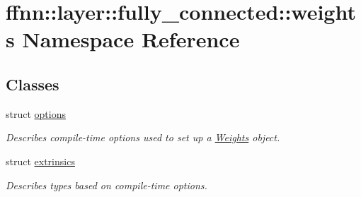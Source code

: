 \hypertarget{namespaceffnn_1_1layer_1_1fully__connected_1_1weights}{\section{ffnn\-:\-:layer\-:\-:fully\-\_\-connected\-:\-:weights Namespace Reference}
\label{namespaceffnn_1_1layer_1_1fully__connected_1_1weights}
}
\subsection*{Classes}
\begin{DoxyCompactItemize}
\item 
struct \hyperlink{structffnn_1_1layer_1_1fully__connected_1_1weights_1_1options}{options}
\begin{DoxyCompactList}\small\item\em Describes compile-\/time options used to set up a \hyperlink{classffnn_1_1layer_1_1fully__connected_1_1_weights}{Weights} object. \end{DoxyCompactList}\item 
struct \hyperlink{structffnn_1_1layer_1_1fully__connected_1_1weights_1_1extrinsics}{extrinsics}
\begin{DoxyCompactList}\small\item\em Describes types based on compile-\/time options. \end{DoxyCompactList}\end{DoxyCompactItemize}
